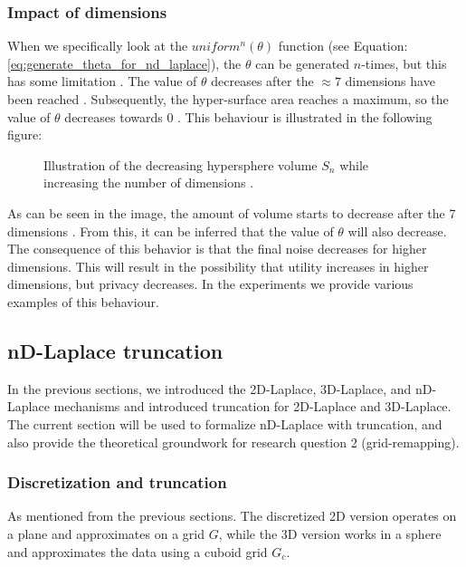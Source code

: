 \subsubsection{Impact of dimensions} \label{theory:privacy-utility-nd}
When we specifically look at the \(uniform^n(\theta)\) function (see Equation: \ref{eq:generate_theta_for_nd_laplace}), the \(\theta\) can be generated \(n\)-times, but this has some limitation \citep{weisstein_hypersphere_nodate}.
The value of \(\theta\) decreases after the $\approx 7$ dimensions have been reached \citep{wells_penguin_1997}. Subsequently, the hyper-surface area reaches a maximum, so the value of $\theta$ decreases towards 0 \citep{weisstein_hypersphere_nodate}.
This behaviour is illustrated in the following figure:
\begin{figure}[H]
\centering
  
  \caption{Illustration of the decreasing hypersphere volume $S_n$ while increasing the number of dimensions \citep{weisstein_hypersphere_nodate}.}
  \label{fig:curse-of-dimensionality}
\end{figure}
As can be seen in the image, the amount of volume starts to decrease after the 7 dimensions . From this, it can be inferred that the value of  $\theta$ will also decrease. 
The consequence of this behavior is that the final noise decreases for higher dimensions. This will result in the possibility that utility increases in higher dimensions, but privacy decreases. In the experiments we provide various examples of this behaviour. 
\newpage
\subsection{nD-Laplace truncation \label{section-grid-remapping}}
In the previous sections, we introduced the 2D-Laplace, 3D-Laplace, and nD-Laplace mechanisms and introduced truncation for 2D-Laplace and 3D-Laplace.
The current section will be used to formalize nD-Laplace with truncation, and also provide the theoretical groundwork for research question 2 (grid-remapping).

\subsubsection{Discretization and truncation} \label{theory:nd-laplace-truncation}
As mentioned from the previous sections. The discretized 2D version operates on a plane and approximates on a grid $G$, while the 3D version works in a sphere and approximates the data using a cuboid grid  $G_c$.

